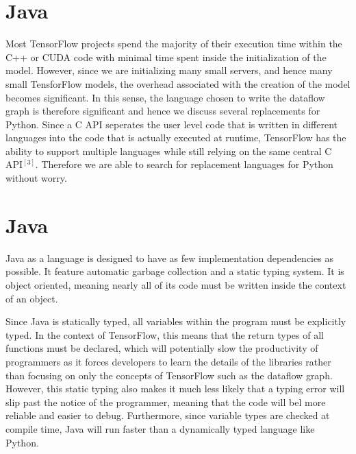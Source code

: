 \section{Java}

Most TensorFlow projects spend the majority of their execution time within the C++ or CUDA code with minimal time spent inside the initialization of the model. However, since we are initializing many small servers, and hence many small TensforFlow models, the overhead associated with the creation of the model becomes significant. In this sense, the language chosen to write the dataflow graph is therefore significant and hence we discuss several replacements for Python. Since a C API seperates the user level code that is written in different languages into the code that is actually executed at runtime, TensorFlow has the ability to support multiple languages while still relying on the same central C API$^{[3]}$. Therefore we are able to search for replacement languages for Python without worry.

\section{Java}

Java as a language is designed to have as few implementation dependencies as possible. It feature automatic garbage collection and a static typing system. It is object oriented, meaning nearly all of its code must be written inside the context of an object.

Since Java is statically typed, all variables within the program must be explicitly typed. In the context of TensorFlow, this means that the return types of all functions must be declared, which will potentially slow the productivity of programmers as it forces developers to learn the details of the libraries rather than focusing on only the concepts of TensorFlow such as the dataflow graph. However, this static typing also makes it much less likely that a typing error will slip past the notice of the programmer, meaning that the code will bel more reliable and easier to debug. Furthermore, since variable types are checked at compile time, Java will run faster than a dynamically typed language like Python.

